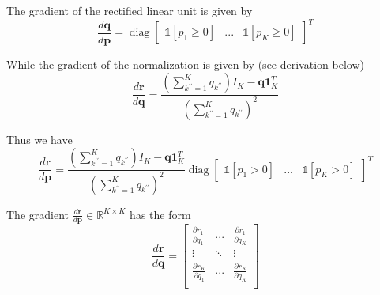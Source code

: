\documentclass{article}
\begin{document}
The gradient of the rectified linear unit is given by
\begin{equation}
    \frac{d \mathbf{q}}{d \mathbf{p}} = \operatorname{diag} \begin{bmatrix}
        \mathds{1} \left[ p_1 \geq 0 \right] & ... & \mathds{1} \left[ p_K \geq 0 \right]
    \end{bmatrix}^T
\end{equation}

While the gradient of the normalization is given by (see derivation below)
\begin{equation}
    \frac{d \mathbf{r}}{d \mathbf{q}} =
    \frac{\left( \sum_{k^{\prime \prime}=1}^K {q}_{k^{\prime \prime}}\right) I_K - \mathbf{q} \mathbf{1}_K^T}{\left(\sum_{k^{\prime \prime}=1}^K {q}_{k^{\prime \prime}} \right)^{2}}
\end{equation}

Thus we have
\begin{equation}
    \frac{d \mathbf{r}}{d \mathbf{p}} =
    \frac{\left( \sum_{k^{\prime \prime}=1}^K {q}_{k^{\prime \prime}}\right) I_K - \mathbf{q} \mathbf{1}_K^T}{\left(\sum_{k^{\prime \prime}=1}^K {q}_{k^{\prime \prime}} \right)^{2}} \operatorname{diag} \begin{bmatrix}
        \mathds{1} \left[ p_1 > 0 \right] & ... & \mathds{1} \left[ p_K > 0 \right]
    \end{bmatrix}^T
\end{equation}

The gradient $\frac{d \mathbf{r}}{d \mathbf{p}} \in \mathbb{R}^{K \times K}$ has the form
\begin{equation}
    \frac{d \mathbf{r}}{d \mathbf{q}} =
        \left[
            \begin{array}{ccc}
                \frac{\partial r_1}{\partial q_1} & ... & \frac{\partial r_1}{\partial q_K} \\
                \vdots & \ddots & \vdots \\
                \frac{\partial r_K}{\partial q_1} & ... & \frac{\partial r_K}{\partial q_K} \\
            \end{array}
        \right]
\end{equation}
\end{document}
